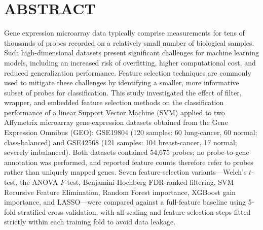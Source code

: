 \chapter*{ABSTRACT}
\onehalfspacing
Gene expression microarray data typically comprise measurements for tens of thousands of probes recorded on a relatively small number of biological samples. Such high-dimensional datasets present significant challenges for machine learning models, including an increased risk of overfitting, higher computational cost, and reduced generalization performance. Feature selection techniques are commonly used to mitigate these challenges by identifying a smaller, more informative subset of probes for classification. This study investigated the effect of filter, wrapper, and embedded feature selection methods on the classification performance of a linear Support Vector Machine (SVM) applied to two Affymetrix microarray gene-expression datasets obtained from the Gene Expression Omnibus (GEO): GSE19804 (120 samples: 60 lung-cancer, 60 normal; class-balanced) and GSE42568 (121 samples: 104 breast-cancer, 17 normal; severely imbalanced). Both datasets contained 54,675 probes; no probe-to-gene annotation was performed, and reported feature counts therefore refer to probes rather than uniquely mapped genes. Seven feature-selection variants---Welch's $t$-test, the ANOVA $F$-test, Benjamini-Hochberg FDR-ranked filtering, SVM Recursive Feature Elimination, Random Forest importance, XGBoost gain importance, and LASSO---were compared against a full-feature baseline using 5-fold stratified cross-validation, with all scaling and feature-selection steps fitted strictly within each training fold to avoid data leakage.

